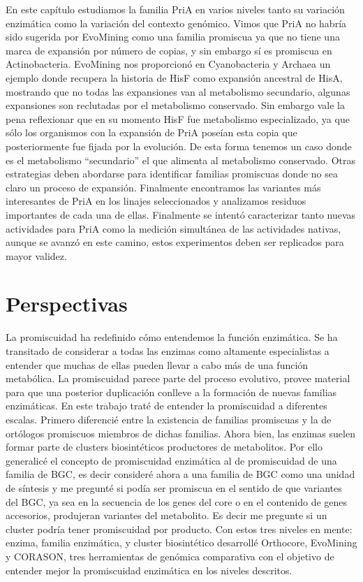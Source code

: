 \documentclass[12pt,twoside]{reedthesis}
\begin{document}
  En este capítulo estudiamos la familia PriA en varios niveles tanto su
  variación enzimática como la variación del contexto genómico. Vimos que
  PriA no habría sido sugerida por EvoMining como una familia promiscua ya
  que no tiene una marca de expansión por número de copias, y sin embargo
  sí es promiscua en Actinobacteria. EvoMining nos proporcionó en
  Cyanobacteria y Archaea un ejemplo donde recupera la historia de HisF
  como expansión ancestral de HisA, mostrando que no todas las expansiones
  van al metabolismo secundario, algunas expansiones son reclutadas por el
  metabolismo conservado. Sin embargo vale la pena reflexionar que en su
  momento HisF fue metabolismo especializado, ya que sólo los organismos
  con la expansión de PriA poseían esta copia que posteriormente fue
  fijada por la evolución. De esta forma tenemos un caso donde es el
  metabolismo ``secundario'' el que alimenta al metabolismo conservado.
  Otras estrategias deben abordarse para identificar familias promiscuas
  donde no sea claro un proceso de expansión. Finalmente encontramos las
  variantes más interesantes de PriA en los linajes seleccionados y
  analizamos residuos importantes de cada una de ellas. Finalmente se
  intentó caracterizar tanto nuevas actividades para PriA como la medición
  simultánea de las actividades nativas, aunque se avanzó en este camino,
  estos experimentos deben ser replicados para mayor validez.
  
  \chapter*{Perspectivas}\label{perspectivas}
  
  \setcounter{chapter}{4} \setcounter{section}{0} La promiscuidad ha
  redefinido cómo entendemos la función enzimática. Se ha transitado de
  considerar a todas las enzimas como altamente especialistas a entender
  que muchas de ellas pueden llevar a cabo más de una función metabólica.
  La promiscuidad parece parte del proceso evolutivo, provee material para
  que una posterior duplicación conlleve a la formación de nuevas familias
  enzimáticas. En este trabajo traté de entender la promiscuidad a
  diferentes escalas. Primero diferencié entre la existencia de familias
  promiscuas y la de ortólogos promiscuos miembros de dichas familias.
  Ahora bien, las enzimas suelen formar parte de clusters biosintéticos
  productores de metabolitos. Por ello generalicé el concepto de
  promiscuidad enzimática al de promiscuidad de una familia de BGC, es
  decir consideré ahora a una familia de BGC como una unidad de síntesis y
  me pregunté si podía ser promiscua en el sentido de que variantes del
  BGC, ya sea en la secuencia de los genes del core o en el contenido de
  genes accesorios, produjeran variantes del metabolito. Es decir me
  pregunte si un cluster podría tener promiscuidad por producto. Con estos
  tres niveles en mente: enzima, familia enzimática, y cluster
  biosintético desarrollé Orthocore, EvoMining y CORASON, tres
  herramientas de genómica comparativa con el objetivo de entender mejor
  la promiscuidad enzimática en los niveles descritos.
  
\end{document}
